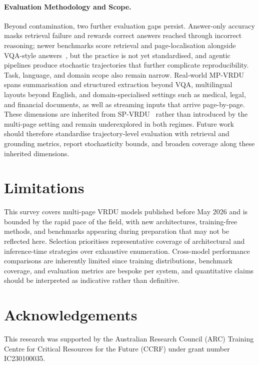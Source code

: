 \documentclass[11pt]{article}
\begin{document}
\paragraph{Evaluation Methodology and Scope.}
\label{sec:evaluation}
Beyond contamination, two further evaluation gaps persist. Answer-only accuracy masks retrieval failure and rewards correct answers reached through incorrect reasoning; newer benchmarks score retrieval and page-localisation alongside VQA-style answers~\cite{hui2024uda, zhu2026doclens}, but the practice is not yet standardised, and agentic pipelines produce stochastic trajectories that further complicate reproducibility. Task, language, and domain scope also remain narrow. Real-world MP-VRDU spans summarisation and structured extraction beyond VQA, multilingual layouts beyond English, and domain-specialised settings such as medical, legal, and financial documents, as well as streaming inputs that arrive page-by-page. These dimensions are inherited from SP-VRDU~\cite{ding2026survey} rather than introduced by the multi-page setting and remain underexplored in both regimes. Future work should therefore standardise trajectory-level evaluation with retrieval and grounding metrics, report stochasticity bounds, and broaden coverage along these inherited dimensions.

\section*{Limitations}
This survey covers multi-page VRDU models published before May 2026 and is bounded by the rapid pace of the field, with new architectures, training-free methods, and benchmarks appearing during preparation that may not be reflected here. Selection prioritises representative coverage of architectural and inference-time strategies over exhaustive enumeration. Cross-model performance comparisons are inherently limited since training distributions, benchmark coverage, and evaluation metrics are bespoke per system, and quantitative claims should be interpreted as indicative rather than definitive.

\section*{Acknowledgements}
This research was supported by the Australian Research Council (ARC) Training Centre for Critical Resources for the Future (CCRF) under grant number IC230100035.

%

\end{document}
